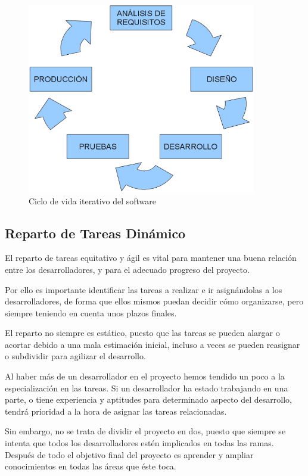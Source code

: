 \begin{figure}[H]
 \centering
 \includegraphics[width=100mm]{figuras/cap5/iterative.png}
 \caption{Ciclo de vida iterativo del software}
\end{figure}

\subsection{Reparto de Tareas Dinámico}

El reparto de tareas equitativo y ágil es vital para mantener una buena
relación entre los desarrolladores, y para el adecuado progreso del proyecto.

Por ello es importante identificar las tareas a realizar e ir asignándolas a
los desarrolladores, de forma que ellos mismos puedan decidir cómo organizarse,
pero siempre teniendo en cuenta unos plazos finales.

El reparto no siempre es estático, puesto que las tareas se pueden alargar o
acortar debido a una mala estimación inicial, incluso a veces se pueden
reasignar o subdividir para agilizar el desarrollo.

Al haber más de un desarrollador en el proyecto hemos tendido un poco a la
especialización en las tareas. Si un desarrollador ha estado trabajando en una
parte, o tiene experiencia y aptitudes para determinado aspecto del desarrollo,
tendrá prioridad a la hora de asignar las tareas relacionadas.

Sin embargo, no se trata de dividir el proyecto en dos, puesto que siempre se
intenta que todos los desarrolladores estén implicados en todas las ramas.
Después de todo el objetivo final del proyecto es aprender y ampliar
conocimientos en todas las áreas que éste toca.

